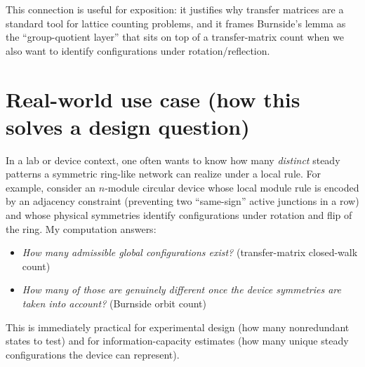 \documentclass[12pt]{article}
\theoremstyle{definition}
\begin{document}
This connection is useful for exposition: it justifies why transfer matrices are a standard tool for lattice counting problems, and it frames Burnside's lemma as the ``group-quotient layer'' that sits on top of a transfer-matrix count when we also want to identify configurations under rotation/reflection.

\section{Real-world use case (how this solves a design question)}
In a lab or device context, one often wants to know how many \emph{distinct} steady patterns a symmetric ring-like network can realize under a local rule. For example, consider an \(n\)-module circular device whose local module rule is encoded by an adjacency constraint (preventing two ``same-sign'' active junctions in a row) and whose physical symmetries identify configurations under rotation and flip of the ring. My computation answers:
\begin{itemize}
    \item \emph{How many admissible global configurations exist?} (transfer-matrix closed-walk count)
    \item \emph{How many of those are genuinely different once the device symmetries are taken into account?} (Burnside orbit count)
\end{itemize}
This is immediately practical for experimental design (how many nonredundant states to test) and for information-capacity estimates (how many unique steady configurations the device can represent).



\end{document}
